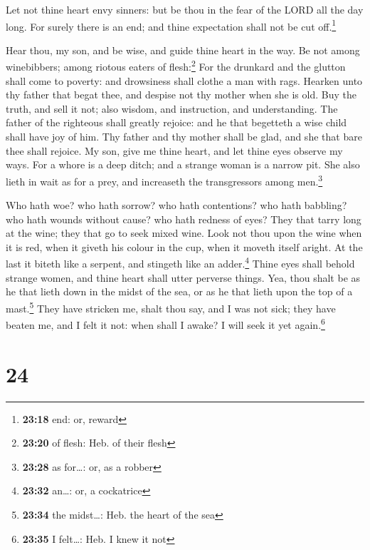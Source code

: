  Let not thine heart envy sinners: but be thou in the
fear of the LORD all the day long.  For surely there is
an end; and thine expectation shall not be cut off.\footnote{\textbf{23:18}
  end: or, reward}

 Hear thou, my son, and be wise, and guide thine heart in
the way.  Be not among winebibbers; among riotous eaters
of flesh:\footnote{\textbf{23:20} of flesh: Heb. of their flesh}
 For the drunkard and the glutton shall come to poverty:
and drowsiness shall clothe a man with rags.  Hearken
unto thy father that begat thee, and despise not thy mother when she is
old.  Buy the truth, and sell it not; also wisdom, and
instruction, and understanding.  The father of the
righteous shall greatly rejoice: and he that begetteth a wise child
shall have joy of him.  Thy father and thy mother shall
be glad, and she that bare thee shall rejoice.  My son,
give me thine heart, and let thine eyes observe my ways. 
For a whore is a deep ditch; and a strange woman is a narrow pit.
 She also lieth in wait as for a prey, and increaseth the
transgressors among men.\footnote{\textbf{23:28} as for\ldots: or, as a
  robber}

 Who hath woe? who hath sorrow? who hath contentions? who
hath babbling? who hath wounds without cause? who hath redness of eyes?
 They that tarry long at the wine; they that go to seek
mixed wine.  Look not thou upon the wine when it is red,
when it giveth his colour in the cup, when it moveth itself aright.
 At the last it biteth like a serpent, and stingeth like
an adder.\footnote{\textbf{23:32} an\ldots: or, a cockatrice}
 Thine eyes shall behold strange women, and thine heart
shall utter perverse things.  Yea, thou shalt be as he
that lieth down in the midst of the sea, or as he that lieth upon the
top of a mast.\footnote{\textbf{23:34} the midst\ldots: Heb. the heart
  of the sea}  They have stricken me, shalt thou say, and
I was not sick; they have beaten me, and I felt it not: when shall I
awake? I will seek it yet again.\footnote{\textbf{23:35} I felt\ldots:
  Heb. I knew it not}

\hypertarget{section-23}{%
\section{24}\label{section-23}}

